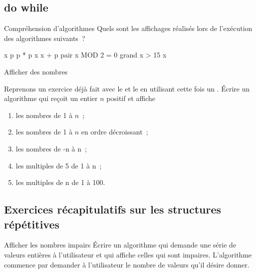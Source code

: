 \subsection{do while}

	\begin{Exercice}{Compréhension d’algorithmes}
		Quels sont les affichages réalisés lors de l’exécution
		des algorithmes suivants~?

		\begin{pseudocode}
			\Let x \Gets 1
			\Let p 
			\Repeat
			\Let p  * p
			\Let x \Gets x + p
			\Let pair \Gets x MOD 2 = 0
			\Let grand \Gets x > 15
		\Write x
	\EndAlgo
\end{pseudocode}		

		\end{Exercice}

		\begin{Exercice}{Afficher des nombres}

			Reprenons un exercice déjà fait avec le \pc{\algorithmicwhile}
			et le \pc{\algorithmicfor}
			en utilisant cette fois un \pc{\algorithmicrepeat} \pc{\algorithmicwhile}.
			Écrire un algorithme qui reçoit un entier $n$ positif et affiche
			\begin{enumerate}[label=\alph*)]
				\item les nombres de 1 à $n$~;
				\item les nombres de 1 à $n$ en ordre décroissant~;
				\item les nombres de -n à n~;
				\item les multiples de 5 de 1 à n~;
				\item les multiples de n de 1 à 100.
			\end{enumerate}
		\end{Exercice}


		
\subsection{Exercices récapitulatifs sur les structures répétitives}


		\begin{Exercice}{Afficher les nombres impairs}
			Écrire un algorithme qui demande une série
			de valeurs entières à l’utilisateur
			et qui affiche celles qui sont impaires.
			L’algorithme commence par demander à l’utilisateur
			le nombre de valeurs qu’il désire donner.
		\end{Exercice}

